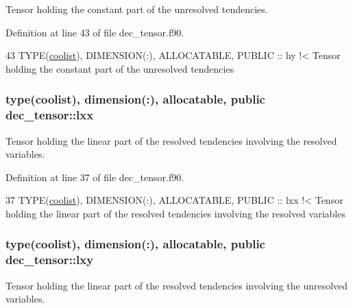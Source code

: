 Tensor holding the constant part of the unresolved tendencies. 



Definition at line 43 of file dec\+\_\+tensor.\+f90.


\begin{DoxyCode}
43   \textcolor{keywordtype}{TYPE}(\hyperlink{structtensor_1_1coolist}{coolist}), \textcolor{keywordtype}{DIMENSION(:)}, \textcolor{keywordtype}{ALLOCATABLE}, \textcolor{keywordtype}{PUBLIC} :: hy\textcolor{comment}{ !< Tensor holding the constant part of the
       unresolved tendencies}
\end{DoxyCode}
\subsubsection[{\texorpdfstring{lxx}{lxx}}]{\setlength{\rightskip}{0pt plus 5cm}type({\bf coolist}), dimension(\+:), allocatable, public dec\+\_\+tensor\+::lxx}\hypertarget{namespacedec__tensor_a9a9feb72e769222453930a8e4a5fdea3}{}\label{namespacedec__tensor_a9a9feb72e769222453930a8e4a5fdea3}


Tensor holding the linear part of the resolved tendencies involving the resolved variables. 



Definition at line 37 of file dec\+\_\+tensor.\+f90.


\begin{DoxyCode}
37   \textcolor{keywordtype}{TYPE}(\hyperlink{structtensor_1_1coolist}{coolist}), \textcolor{keywordtype}{DIMENSION(:)}, \textcolor{keywordtype}{ALLOCATABLE}, \textcolor{keywordtype}{PUBLIC} :: lxx\textcolor{comment}{ !< Tensor holding the linear part of the
       resolved tendencies involving the resolved variables}
\end{DoxyCode}
\subsubsection[{\texorpdfstring{lxy}{lxy}}]{\setlength{\rightskip}{0pt plus 5cm}type({\bf coolist}), dimension(\+:), allocatable, public dec\+\_\+tensor\+::lxy}\hypertarget{namespacedec__tensor_a994871cb59cfc0743f3d2a22aa81abc4}{}\label{namespacedec__tensor_a994871cb59cfc0743f3d2a22aa81abc4}


Tensor holding the linear part of the resolved tendencies involving the unresolved variables. 



